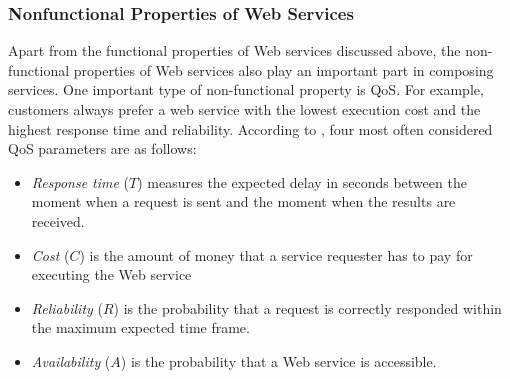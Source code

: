 
\subsubsection{Nonfunctional Properties of Web Services}\label{nonfunctional}
Apart from the functional properties of Web services discussed above, the non-functional properties of Web services also play an important part in composing services. One important type of non-functional property is QoS. For example, customers always prefer a web service with the lowest execution cost and the highest response time and reliability. According to \cite{zeng2003quality}, four most often considered QoS parameters are as follows:
\begin{itemize}
\item \textit{Response time} ($T$) measures the expected delay in seconds between the moment when a request is sent and the moment when the results are received.
\item \textit{Cost} ($C$) is the amount of money that a service requester has to pay for executing the Web service
\item \textit{Reliability} ($R$) is the probability that a request is correctly responded within the maximum expected time frame.
\item \textit{Availability} ($A$) is the probability that a Web service is accessible.
\end{itemize}

